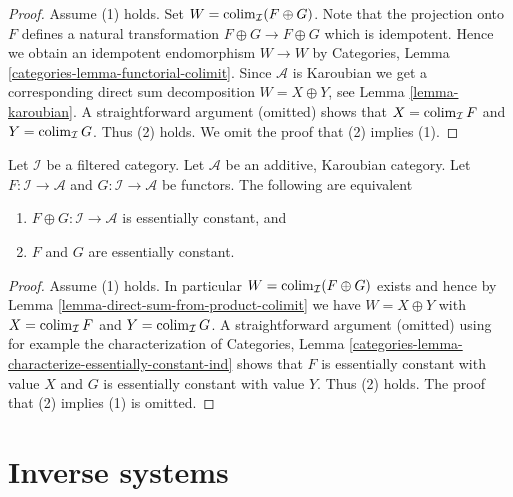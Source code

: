 \begin{proof}
Assume (1) holds. Set $W = \mathop{\mathrm{colim}}\nolimits_\mathcal{I}(F \oplus G)$.
Note that the projection onto $F$ defines a natural transformation
$F \oplus G \to F \oplus G$ which is idempotent. Hence we obtain
an idempotent endomorphism $W \to W$ by
Categories, Lemma \ref{categories-lemma-functorial-colimit}.
Since $\mathcal{A}$ is Karoubian we get a corresponding direct
sum decomposition $W = X \oplus Y$, see Lemma \ref{lemma-karoubian}.
A straightforward argument (omitted) shows that
$X = \mathop{\mathrm{colim}}\nolimits_\mathcal{I} F$ and $Y = \mathop{\mathrm{colim}}\nolimits_\mathcal{I} G$.
Thus (2) holds. We omit the proof that (2) implies (1).
\end{proof}

\begin{lemma}
\label{lemma-direct-sum-from-product-essentially-constant}
Let $\mathcal{I}$ be a filtered category. Let $\mathcal{A}$
be an additive, Karoubian category. Let $F : \mathcal{I} \to \mathcal{A}$ and
$G : \mathcal{I} \to \mathcal{A}$ be functors. The following are equivalent
\begin{enumerate}
\item $F \oplus G : \mathcal{I} \to \mathcal{A}$
is essentially constant, and
\item $F$ and $G$ are essentially constant.
\end{enumerate}
\end{lemma}

\begin{proof}
Assume (1) holds. In particular $W = \mathop{\mathrm{colim}}\nolimits_\mathcal{I}(F \oplus G)$ exists
and hence by Lemma \ref{lemma-direct-sum-from-product-colimit}
we have $W = X \oplus Y$ with $X = \mathop{\mathrm{colim}}\nolimits_\mathcal{I} F$ and
$Y = \mathop{\mathrm{colim}}\nolimits_\mathcal{I} G$. A straightforward argument (omitted)
using for example the characterization of
Categories, Lemma \ref{categories-lemma-characterize-essentially-constant-ind}
shows that $F$ is essentially constant with value $X$ and $G$ is essentially
constant with value $Y$. Thus (2) holds. The proof that (2) implies (1)
is omitted.
\end{proof}






\section{Inverse systems}
\label{section-inverse-systems}


